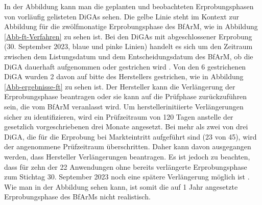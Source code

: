 \documentclass{article}
\begin{document}
			In der Abbildung kann man die geplanten und beobachteten Erprobungsphasen von vorläufig gelisteten DiGAs sehen. Die gelbe Linie steht im Kontext zur Abbildung für die zwölfmonatige Erprobungsphase des BfArM, wie in Abbildung \ref{Abb-ft-Verfahren} zu sehen ist. Bei den DiGAs mit abgeschlossener Erprobung (30. September 2023, blaue und pinke Linien) handelt es sich um den Zeitraum zwischen dem Listungsdatum und dem Entscheidungsdatum des BfArM, ob die DiGA dauerhaft aufgenommen oder gestrichen wird \cite[vgl. S.10]{TK-Report-2}. Von den 6 gestrichenen DiGA wurden 2 davon auf bitte des Herstellers gestrichen, wie in Abbildung \ref{Abb-ergebnisse-ft} zu sehen ist. Der Hersteller kann die Verlängerung der Erprobungsphase beantragen oder sie kann auf die Prüfphase zurückzuführen sein, die vom BfArM veranlasst wird. Um herstellerinitiierte Verlängerungen sicher zu identifizieren, wird ein Prüfzeitraum von 120 Tagen anstelle der gesetzlich vorgeschriebenen drei Monate angesetzt. Bei mehr als zwei von drei DiGA, die für die Erprobung bei Markteintritt aufgeführt sind (23 von 45), wird der angenommene Prüfzeitraum überschritten. Daher kann davon ausgegangen werden, dass Hersteller Verlängerungen beantragen. Es ist jedoch zu beachten, dass für zehn der 22 Anwendungen ohne bereits verlängerte Erprobungsphase zum Stichtag 30. September 2023 noch eine spätere Verlängerung möglich ist \cite[vgl S. 10]{TK-Report-2}. Wie man in der Abbildung sehen kann, ist somit die auf 1 Jahr angesetzte Erprobungsphase des BfArMs nicht realistisch.
\end{document}
